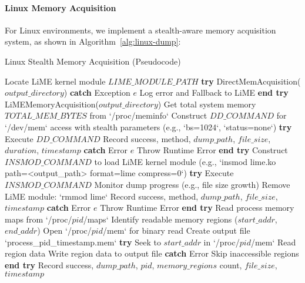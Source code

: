 \paragraph{Linux Memory Acquisition}

For Linux environments, we implement a stealth-aware memory acquisition system, as shown in Algorithm~\ref{alg:linux-dump}:

\begin{algorithm}[!htbp]
\caption{Linux Stealth Memory Acquisition (Pseudocode)}
\label{alg:linux-dump}
\begin{algorithmic}[1]
    \State Locate LiME kernel module $LIME\_MODULE\_PATH$
        \State \textbf{try}
            \State \Return DirectMemAcquisition($output\_directory$)
        \State \textbf{catch} {Exception $e$}
            \State Log error and Fallback to LiME
        \State \textbf{end try}
    \EndIf
    \Return LiMEMemoryAcquisition($output\_directory$)
\EndProcedure
\Statex
{}
    \State Get total system memory $TOTAL\_MEM\_BYTES$ from `/proc/meminfo`
    \State Construct $DD\_COMMAND$ for `/dev/mem` access with stealth parameters (e.g., `bs=1024`, `status=none`)
    \State \textbf{try}
        \State Execute $DD\_COMMAND$
        \State Record success, method, $dump\_path$, $file\_size$, $duration$, $timestamp$
    \State \textbf{catch} {Error $e$}
        \State Throw Runtime Error
    \State \textbf{end try}
\EndProcedure
\Statex
{}
    \State Construct $INSMOD\_COMMAND$ to load LiME kernel module (e.g., `insmod lime.ko path=<output\_path> format=lime compress=0`)
    \State \textbf{try}
        \State Execute $INSMOD\_COMMAND$
        \State Monitor dump progress (e.g., file size growth)
        \State Remove LiME module: `rmmod lime`
        \State Record success, method, $dump\_path$, $file\_size$, $timestamp$
    \State \textbf{catch} {Error $e$}
        \State Throw Runtime Error
    \State \textbf{end try}
\EndProcedure
\Statex
{}
    \State Read process memory maps from `/proc/$pid$/maps`
    \State Identify readable memory regions ($start\_addr$, $end\_addr$)
    \State Open `/proc/$pid$/mem` for binary read
    \State Create output file `process\_pid\_timestamp.mem`
        \State \textbf{try}
            \State Seek to $start\_addr$ in `/proc/$pid$/mem`
            \State Read region data
            \State Write region data to output file
        \State \textbf{catch} {Error}
            \State Skip inaccessible regions
        \State \textbf{end try}
    \EndFor
    \State Record success, $dump\_path$, $pid$, $memory\_regions$ count, $file\_size$, $timestamp$
\EndProcedure
\end{algorithmic}
\end{algorithm}


